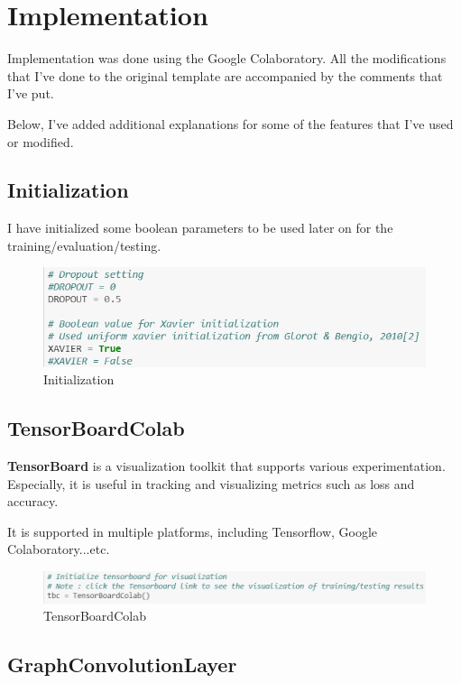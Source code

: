 \chapter{Implementation}
Implementation was done using the Google Colaboratory. All the modifications that I've done to the original template are accompanied by the comments that I've put.

Below, I've added additional explanations for some of the features that I've used or modified.


\section{Initialization}

I have initialized some boolean parameters to be used later on for the training/evaluation/testing.

\begin{figure}[htbp]
\centering
\includegraphics[width=0.6\linewidth]{implementation/fig/code0.png}
\caption{Initialization}
\label{fig:code0}
\end{figure}

\section{TensorBoardColab}

{\bf TensorBoard} is a visualization toolkit that supports various experimentation. Especially, it is useful in tracking and visualizing metrics such as loss and accuracy.

It is supported in multiple platforms, including Tensorflow, Google Colaboratory...etc.

\begin{figure}[htbp]
\centering
\includegraphics[width=0.6\linewidth]{implementation/fig/code1.png}
\caption{TensorBoardColab}
\label{fig:code1}
\end{figure}


\section{GraphConvolutionLayer}

